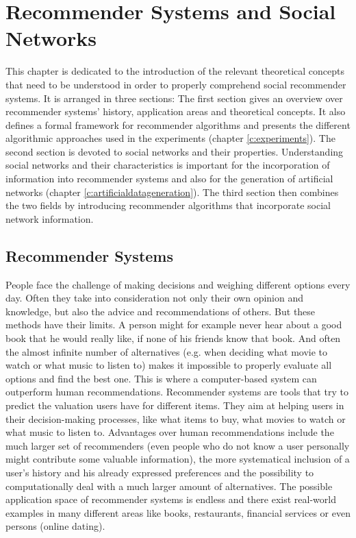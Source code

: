 \chapter{Recommender Systems and Social Networks}
\label{c:recommendersystemsandsocialnetworks} This chapter is dedicated to the introduction of the relevant theoretical concepts that need to be understood in order to properly comprehend social recommender systems. It is arranged in three sections: The first section gives an overview over recommender systems' history, application areas and theoretical concepts. It also defines a formal framework for recommender algorithms and presents the different algorithmic approaches used in the experiments (chapter \ref{c:experiments}). The second section is devoted to social networks and their properties. Understanding social networks and their characteristics is important for the incorporation of information into recommender systems and also for the generation of artificial networks (chapter \ref{c:artificialdatageneration}). The third section then combines the two fields by introducing recommender algorithms that incorporate social network information.

\section{Recommender Systems}
\label{st:recommendersystems} People face the challenge of making decisions and weighing different options every day. Often they take into consideration not only their own opinion and knowledge, but also the advice and recommendations of others. But these methods have their limits. A person might for example never hear about a good book that he would really like, if none of his friends know that book. And often the almost infinite number of alternatives (e.g. when deciding what movie to watch or what music to listen to) makes it impossible to properly evaluate all options and find the best one. This is where a computer-based system can outperform human recommendations. Recommender systems are tools that try to predict the valuation users have for different items. They aim at helping users in their decision-making processes, like what items to buy, what movies to watch or what music to listen to. Advantages over human recommendations include the much larger set of recommenders (even people who do not know a user personally might contribute some valuable information), the more systematical inclusion of a user's history and his already expressed preferences and the possibility to computationally deal with a much larger amount of alternatives. The possible application space of recommender systems is endless and there exist real-world examples in many different areas like books, restaurants, financial services \cite{Felfernig_2007} or even persons (online dating).


